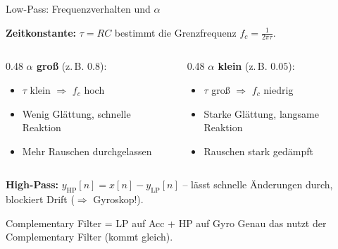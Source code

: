 \documentclass[%
  aspectratio=169,
  10pt
]{beamer}
\begin{document}
\begin{frame}{Low-Pass: Frequenzverhalten und $\alpha$}

\textbf{Zeitkonstante:} $\tau = RC$ bestimmt die Grenzfrequenz
$f_c = \frac{1}{2\pi\tau}$.

\vspace{1mm}
\begin{columns}[T]
  \begin{column}{0.48\textwidth}
    \textbf{$\alpha$ groß} (z.\,B. $0.8$):
    \begin{itemize}\setlength{\itemsep}{0pt}\setlength{\parskip}{0pt}
      \item $\tau$ klein $\Rightarrow$ $f_c$ hoch
      \item Wenig Glättung, schnelle Reaktion
      \item Mehr Rauschen durchgelassen
    \end{itemize}
  \end{column}
  \begin{column}{0.48\textwidth}
    \textbf{$\alpha$ klein} (z.\,B. $0.05$):
    \begin{itemize}\setlength{\itemsep}{0pt}\setlength{\parskip}{0pt}
      \item $\tau$ groß $\Rightarrow$ $f_c$ niedrig
      \item Starke Glättung, langsame Reaktion
      \item Rauschen stark gedämpft
    \end{itemize}
  \end{column}
\end{columns}

\vspace{1mm}
\textbf{High-Pass:}
$y_\mathrm{HP}[n] = x[n] - y_\mathrm{LP}[n]$
-- lässt schnelle Änderungen durch, blockiert Drift ($\Rightarrow$ Gyroskop!).

\vspace{1mm}
\begin{exampleblock}{Complementary Filter = LP auf Acc + HP auf Gyro}
  \vspace{-2mm}Genau das nutzt der Complementary Filter (kommt gleich).\vspace{-2mm}
\end{exampleblock}

\end{frame}
\end{document}
